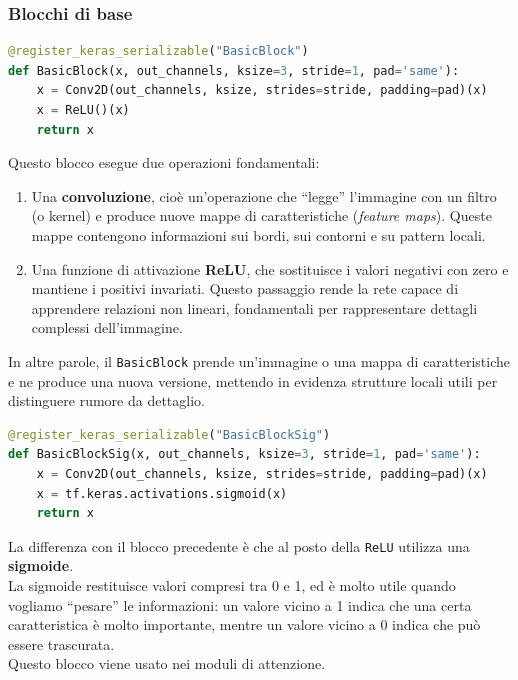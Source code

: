 \documentclass[12pt,a4paper,openright,twoside]{book}
\begin{document}
\subsubsection*{Blocchi di base}
\begin{lstlisting}[language=Python, caption={Implementazione del blocco di base BasicBlock}, label={lst:basicblock}]
@register_keras_serializable("BasicBlock")
def BasicBlock(x, out_channels, ksize=3, stride=1, pad='same'):
    x = Conv2D(out_channels, ksize, strides=stride, padding=pad)(x)
    x = ReLU()(x)
    return x
\end{lstlisting}
Questo blocco esegue due operazioni fondamentali:  
\begin{enumerate}
    \item[1.] Una \textbf{convoluzione}, cioè un'operazione che “legge” l'immagine con un filtro (o kernel) e produce nuove mappe di caratteristiche (\textit{feature maps}). Queste mappe contengono informazioni sui bordi, sui contorni e su pattern locali.  
    \item[2.] Una funzione di attivazione \textbf{ReLU}, che sostituisce i valori negativi con zero e mantiene i positivi invariati. Questo passaggio rende la rete capace di apprendere relazioni non lineari, fondamentali per rappresentare dettagli complessi dell'immagine.  
\end{enumerate}
In altre parole, il \texttt{BasicBlock} prende un'immagine o una mappa di caratteristiche e ne produce una nuova versione, mettendo in evidenza strutture locali utili per distinguere rumore da dettaglio.
\newpage
\begin{lstlisting}[language=Python, caption={Implementazione del blocco di base con sigmoide BasicBlockSig}, label={lst:basicblocksig}]
@register_keras_serializable("BasicBlockSig")
def BasicBlockSig(x, out_channels, ksize=3, stride=1, pad='same'):
    x = Conv2D(out_channels, ksize, strides=stride, padding=pad)(x)
    x = tf.keras.activations.sigmoid(x)
    return x
\end{lstlisting}
La differenza con il blocco precedente è che al posto della \texttt{ReLU} utilizza una \textbf{sigmoide}.\\
La sigmoide restituisce valori compresi tra 0 e 1, ed è molto utile quando vogliamo “pesare” le informazioni: un valore vicino a 1 indica che una certa caratteristica è molto importante, mentre un valore vicino a 0 indica che può essere trascurata.\\  
Questo blocco viene usato nei moduli di attenzione.
\end{document}
